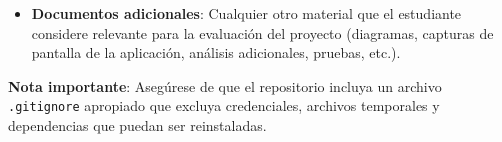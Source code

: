 \documentclass[10pt]{article}
\begin{document}
\begin{itemize}
		\item \textbf{Documentos adicionales}: Cualquier otro material que el estudiante considere relevante para la evaluación del proyecto (diagramas, capturas de pantalla de la aplicación, análisis adicionales, pruebas, etc.).
	\end{itemize}
	
	\vspace{2mm}
	
	\textbf{Nota importante}: Asegúrese de que el repositorio incluya un archivo \texttt{.gitignore} apropiado que excluya credenciales, archivos temporales y dependencias que puedan ser reinstaladas.
\end{document}
